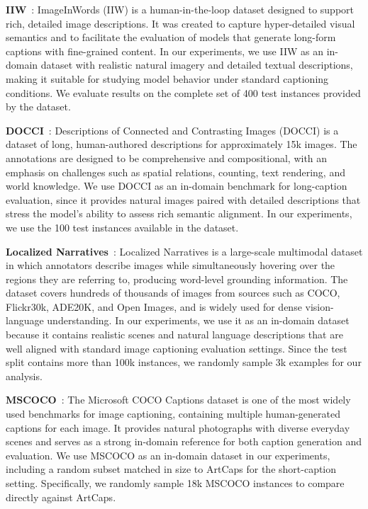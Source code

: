 \documentclass[11pt]{article}
\begin{document}
\textbf{IIW}~\cite{garg2024imageinwords}:
ImageInWords (IIW) is a human-in-the-loop dataset designed to support rich, detailed image descriptions. It was created to capture hyper-detailed visual semantics and to facilitate the evaluation of models that generate long-form captions with fine-grained content. In our experiments, we use IIW as an in-domain dataset with realistic natural imagery and detailed textual descriptions, making it suitable for studying model behavior under standard captioning conditions. We evaluate results on the complete set of 400 test instances provided by the dataset.

\textbf{DOCCI}~\cite{onoe2024docci}:
Descriptions of Connected and Contrasting Images (DOCCI) is a dataset of long, human-authored descriptions for approximately 15k images. The annotations are designed to be comprehensive and compositional, with an emphasis on challenges such as spatial relations, counting, text rendering, and world knowledge. We use DOCCI as an in-domain benchmark for long-caption evaluation, since it provides natural images paired with detailed descriptions that stress the model’s ability to assess rich semantic alignment. In our experiments, we use the 100 test instances available in the dataset.

\textbf{Localized Narratives}~\cite{pont2020connecting}:
Localized Narratives is a large-scale multimodal dataset in which annotators describe images while simultaneously hovering over the regions they are referring to, producing word-level grounding information. The dataset covers hundreds of thousands of images from sources such as COCO, Flickr30k, ADE20K, and Open Images, and is widely used for dense vision-language understanding. In our experiments, we use it as an in-domain dataset because it contains realistic scenes and natural language descriptions that are well aligned with standard image captioning evaluation settings. Since the test split contains more than 100k instances, we randomly sample 3k examples for our analysis.

\textbf{MSCOCO}~\cite{lin2014microsoft}:
The Microsoft COCO Captions dataset is one of the most widely used benchmarks for image captioning, containing multiple human-generated captions for each image. It provides natural photographs with diverse everyday scenes and serves as a strong in-domain reference for both caption generation and evaluation. We use MSCOCO as an in-domain dataset in our experiments, including a random subset matched in size to ArtCaps for the short-caption setting. Specifically, we randomly sample 18k MSCOCO instances to compare directly against ArtCaps.
\end{document}
